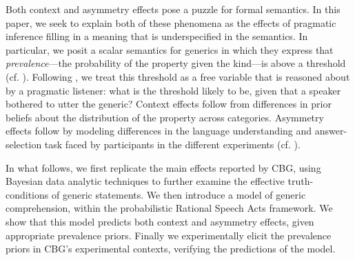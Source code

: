 \documentclass[10pt,letterpaper]{article}
\begin{document}
Both context and asymmetry effects pose a puzzle for formal semantics. 
In this paper, we seek to explain both of these phenomena as the effects of pragmatic inference filling in a meaning that is underspecified in the semantics. 
In particular, we posit a scalar semantics for generics in which they express that \emph{prevalence}---the probability of the property given the kind---is above a threshold (cf. ). Following , we treat this threshold as a free variable that is reasoned about by a pragmatic listener: what is the threshold likely to be, given that a speaker bothered to utter the generic? Context effects follow from differences in prior beliefs about the distribution of the property across categories. Asymmetry effects follow by modeling differences in the language understanding and answer-selection task faced by participants in the different experiments (cf. ).  %


In what follows, we first replicate the main effects reported by CBG, using Bayesian data analytic techniques to further examine the effective truth-conditions of generic statements. We then introduce a model of generic comprehension, within the probabilistic Rational Speech Acts framework. We show that this model predicts both context and asymmetry effects, given appropriate prevalence priors. Finally we experimentally elicit the prevalence priors in CBG's experimental contexts, verifying the predictions of the model.



\end{document}
